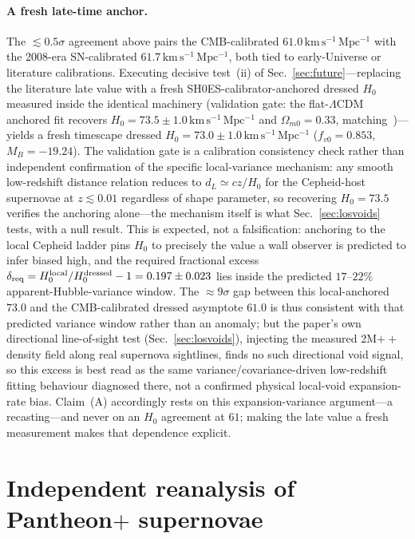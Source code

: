 \documentclass[aps,prd,twocolumn,nofootinbib,superscriptaddress,floatfix]{revtex4-2}
\newcommand{\Ho}{H_{0}}
\newcommand{\fvo}{f_{v0}}
\newcommand{\kmsmpc}{\,\mathrm{km\,s^{-1}\,Mpc^{-1}}}
\newcommand{\Lcdm}{\Lambda\mathrm{CDM}}
\begin{document}
\paragraph*{A fresh late-time anchor.} The $\lesssim0.5\sigma$ agreement above pairs the
CMB-calibrated $61.0\kmsmpc$ with the 2008-era SN-calibrated $61.7\kmsmpc$, both
tied to early-Universe or literature calibrations. Executing decisive
test~(ii) of Sec.~\ref{sec:future}---replacing the literature late value with a
fresh SH0ES-calibrator-anchored dressed $\Ho$ measured inside the identical
machinery (validation gate: the flat-$\Lcdm$ anchored fit recovers
$\Ho=73.5\pm1.0\kmsmpc$ and $\Omega_{m0}=0.33$, matching~\cite{Brout2022})---yields
a fresh timescape dressed $\Ho=73.0\pm1.0\kmsmpc$ ($\fvo=0.853$, $M_B=-19.24$).
The validation gate is a calibration consistency check rather than independent
confirmation of the specific local-variance mechanism: any smooth low-redshift
distance relation reduces to $d_L\simeq cz/\Ho$ for the Cepheid-host supernovae at
$z\lesssim0.01$ regardless of shape parameter, so recovering $\Ho=73.5$ verifies
the anchoring alone---the mechanism itself is what Sec.~\ref{sec:losvoids} tests,
with a null result.
This is expected, not a falsification: anchoring to the local Cepheid ladder pins
$\Ho$ to precisely the value a wall observer is predicted to infer biased high,
and the required fractional excess
$\delta_{\rm req}=\Ho^{\rm local}/\Ho^{\rm dressed}-1=0.197\pm0.023$ lies inside
the predicted $17$--$22\%$ apparent-Hubble-variance window. The $\approx9\sigma$
gap between this local-anchored $73.0$ and the CMB-calibrated dressed asymptote
$61.0$ is thus consistent with that predicted variance window rather than an
anomaly; but the paper's own directional line-of-sight test
(Sec.~\ref{sec:losvoids}), injecting the measured 2M$++$ density field along real
supernova sightlines, finds no such directional void signal, so this excess is best
read as the same variance/covariance-driven low-redshift fitting behaviour
diagnosed there, not a confirmed physical local-void expansion-rate bias. Claim~(A)
accordingly rests on this expansion-variance argument---a recasting---and never on
an $\Ho$ agreement at $61$; making the late value a fresh measurement makes that
dependence explicit.

\section{Independent reanalysis of Pantheon$+$ supernovae}
\label{sec:sne}
\end{document}
